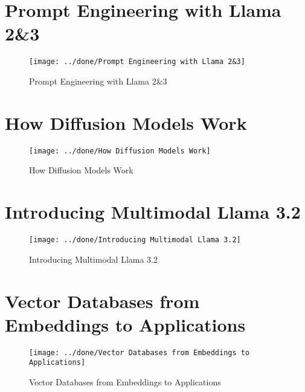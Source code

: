 \documentclass[a4paper,12pt]{article}
\begin{document}
\section*{Prompt Engineering with Llama 2\&3}
\begin{figure}[h]
	\centering
	\vspace{-10pt} %
	\texttt{[image: ../done/Prompt Engineering with Llama 2\&3]}
	\vspace{-10pt} %
	\caption{Prompt Engineering with Llama 2\&3}
	\vspace{-10pt} %
\end{figure}


\section*{How Diffusion Models Work}
\begin{figure}[h]
	\centering
	\vspace{-10pt} %
	\texttt{[image: ../done/How Diffusion Models Work]}
	\vspace{-10pt} %
	\caption{How Diffusion Models Work}
	\vspace{-10pt} %
\end{figure}
\newpage
\section*{Introducing Multimodal Llama 3.2}
\begin{figure}[h]
	\centering
	\vspace{-10pt} %
	\texttt{[image: ../done/Introducing Multimodal Llama 3.2]}
	\vspace{-10pt} %
	\caption{Introducing Multimodal Llama 3.2}
	\vspace{-10pt} %
\end{figure}


\section*{Vector Databases from Embeddings to Applications}
\begin{figure}[h]
	\centering
	\vspace{-10pt} %
	\texttt{[image: ../done/Vector Databases from Embeddings to Applications]}
	\vspace{-10pt} %
	\caption{Vector Databases from Embeddings to Applications}
	\vspace{-10pt} %
\end{figure}
\newpage
\end{document}
